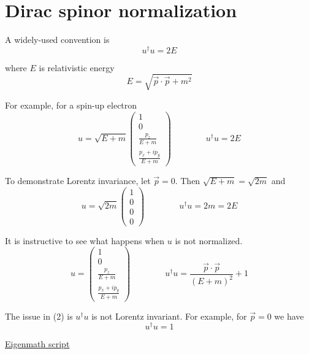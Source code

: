 

\section*{Dirac spinor normalization}

A widely-used convention is
\begin{equation*}
u^\dag u=2E
\end{equation*}

where $E$ is relativistic energy
\begin{equation*}
E=\sqrt{\vec p\cdot\vec p+m^2}
\end{equation*}

For example, for a spin-up electron
\begin{equation*}
u=\sqrt{E+m}\begin{pmatrix}
1
\\[1ex]
0
\\[1ex]
{\displaystyle\frac{p_z}{E+m}}
\\[2ex]
{\displaystyle\frac{p_x+ip_y}{E+m}}
\end{pmatrix}
\qquad\qquad
u^\dag u=2E
\tag{1}
\end{equation*}

To demonstrate Lorentz invariance, let $\vec p=0$.
Then $\sqrt{E+m}=\sqrt{2m}$ and
\begin{equation*}
u=\sqrt{2m}\begin{pmatrix}
1\\0\\0\\0
\end{pmatrix}
\qquad\qquad
u^\dag u=2m=2E
\end{equation*}

It is instructive to see what happens when $u$ is not normalized.
\begin{equation*}
u=\begin{pmatrix}
1
\\[1ex]
0
\\[1ex]
{\displaystyle\frac{p_z}{E+m}}
\\[2ex]
{\displaystyle\frac{p_x+ip_y}{E+m}}
\end{pmatrix}
\qquad\qquad
u^\dag u=\frac{\vec p\cdot\vec p}{(E+m)^2}+1
\tag{2}
\end{equation*}

The issue in (2) is $u^\dag u$ is not Lorentz invariant.
For example, for $\vec p=0$ we have
\begin{equation*}
u^\dag u=1
\end{equation*}

\href{https://georgeweigt.github.io/examples/dirac-spinor-normalization-demo.html}{Eigenmath script}


